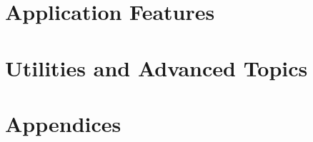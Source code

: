 \documentclass[11pt,twoside,openright]{book}
\begin{document}
\part{Application Features}










\part{Utilities and Advanced Topics}






\appendix
\part{Appendices}




\backmatter
\printindex
\end{document}
